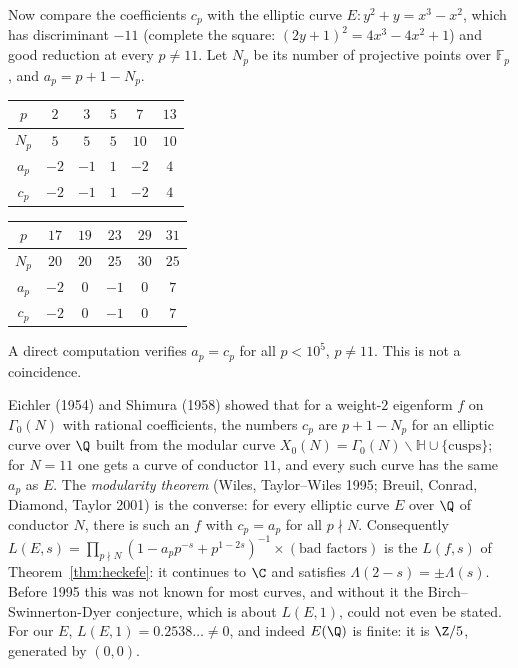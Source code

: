 Now compare the coefficients $c_p$ with the elliptic curve $E:y^2+y=x^3-x^2$, which has discriminant $-11$ (complete the square: $(2y+1)^2=4x^3-4x^2+1$) and good
reduction at every $p\ne11$. Let $N_p$ be its number of projective points over $\mathbb F_p$, and $a_p=p+1-N_p$.

\begin{center}
\begin{tabular}{c|ccccc}
$p$&$2$&$3$&$5$&$7$&$13$\\\hline
$N_p$&$5$&$5$&$5$&$10$&$10$\\
$a_p$&$-2$&$-1$&$1$&$-2$&$4$\\
$c_p$&$-2$&$-1$&$1$&$-2$&$4$
\end{tabular}\par\medskip
\begin{tabular}{c|ccccc}
$p$&$17$&$19$&$23$&$29$&$31$\\\hline
$N_p$&$20$&$20$&$25$&$30$&$25$\\
$a_p$&$-2$&$0$&$-1$&$0$&$7$\\
$c_p$&$-2$&$0$&$-1$&$0$&$7$
\end{tabular}
\end{center}

A direct computation verifies $a_p=c_p$ for all $p<10^5$, $p\ne11$. This is not a coincidence.

\begin{remark}\label{rem:modularity}
Eichler (1954) and Shimura (1958) showed that for a weight-$2$ eigenform $f$ on $\Gamma_0(N)$ with rational coefficients, the numbers $c_p$ are $p+1-N_p$ for an
elliptic curve over $\Q$ built from the modular curve $X_0(N)=\Gamma_0(N)\backslash\mathbb H\cup\{\text{cusps}\}$; for $N=11$ one gets a curve of conductor $11$, and every
such curve has the same $a_p$ as $E$. The \emph{modularity theorem} (Wiles, Taylor--Wiles 1995; Breuil, Conrad, Diamond, Taylor 2001) is the converse: for every elliptic
curve $E$ over $\Q$ of conductor $N$, there is such an $f$ with $c_p=a_p$ for all $p\nmid N$. Consequently $L(E,s)=\prod_{p\nmid N}(1-a_pp^{-s}+p^{1-2s})^{-1}\times(\text{bad factors})$
is the $L(f,s)$ of Theorem~\ref{thm:heckefe}: it continues to $\C$ and satisfies $\Lambda(2-s)=\pm\Lambda(s)$. Before 1995 this was not known for most curves, and without it
the Birch--Swinnerton-Dyer conjecture, which is about $L(E,1)$, could not even be stated. For our $E$, $L(E,1)=0.2538\ldots\ne0$, and indeed $E(\Q)$ is finite: it is
$\Z/5$, generated by $(0,0)$.
\end{remark}

